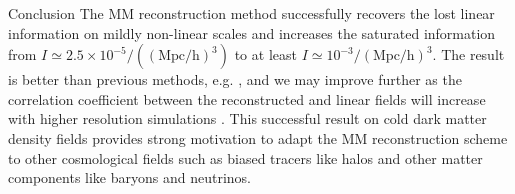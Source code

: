 \begin{section}{Conclusion}
  \label{sec:conclusion}
  The MM reconstruction method successfully recovers the lost linear
  information on mildly non-linear scales and increases the saturated
  information from $I \simeq 2.5 \times 10^{-5}/(\mathrm{(Mpc/h)}^3)$
  to at least $I \simeq 10^{-3}/\mathrm{(Mpc/h)}^3$.  The result is
  better than previous methods,
  e.g. \cite{bib:Mark2006,bib:Mark2009,bib:Zhang2011,bib:Yu2012}, and
  we may improve further as the correlation coefficient between the
  reconstructed and linear fields will increase with higher resolution
  simulations \cite{bib:ZhuH2016}.  This successful result on cold
  dark matter density fields provides strong motivation to adapt the
  MM reconstruction scheme to other cosmological fields such as biased
  tracers like halos and other matter components like baryons and
  neutrinos.



\end{section}
